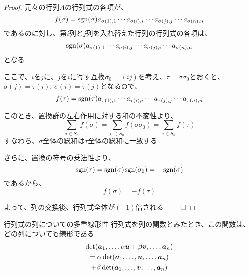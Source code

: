 \documentclass[../../../topic_linear-algebra]{subfiles}
\begin{document}
\begin{proof}
  元々の行列$A$の行列式の各項が、
  \begin{equation*}
    f(\sigma) =\operatorname{sgn}(\sigma) a_{\sigma(1),1} \cdots a_{\sigma(i),i} \cdots a_{\sigma(j),j} \cdots a_{\sigma(n),n}
  \end{equation*}
  であるのに対し、第$i$列と$j$列を入れ替えた行列の行列式の各項は、
  \begin{equation*}
    \operatorname{sgn}(\sigma) a_{\sigma(1),1} \cdots a_{\sigma(i),j} \cdots a_{\sigma(j),i} \cdots a_{\sigma(n),n}
  \end{equation*}
  となる

  ここで、$i$を$j$に、$j$を$i$に写す互換$\sigma_0 = (ij)$を考え、$\tau = \sigma \sigma_0$とおくと、$\sigma(j) = \tau(i), \, \sigma(i) = \tau(j)$となるので、
  \begin{equation*}
    f(\tau) = \operatorname{sgn}(\tau) a_{\tau(1),1} \cdots a_{\tau(i),i} \cdots a_{\tau(j),j} \cdots a_{\tau(n),n}
  \end{equation*}

  このとき、\hyperref[thm:sum-invariance-under-permutation-action]{置換群の左右作用に対する和の不変性}より、
  \begin{equation*}
    \sum_{\sigma \in S_n} f(\sigma) = \sum_{\sigma \in S_n} f(\sigma\sigma_0) = \sum_{\tau \in S_n} f(\tau)
  \end{equation*}
  すなわち、$\sigma$全体の総和は$\tau$全体の総和に一致する

  \br

  さらに、\hyperref[thm:sign-multiplicativity]{置換の符号の乗法性}より、
  \begin{equation*}
    \operatorname{sgn}(\tau) = \operatorname{sgn}(\sigma) \operatorname{sgn}(\sigma_0) = -\operatorname{sgn}(\sigma)
  \end{equation*}
  であるから、
  \begin{equation*}
    f(\sigma) = -f(\tau)
  \end{equation*}

  よって、列の交換後、行列式全体が$(-1)$倍される $\qed$
\end{proof}

\sectionline

\begin{theorem}{行列式の列についての多重線形性}
  行列式を列の関数とみたとき、この関数は、どの列についても線形である
  \begin{multline*}
    \det(\vb*{a}_1,\ldots,\alpha\vb*{u} + \beta\vb*{v}, \ldots, \vb*{a}_n) \\
    = \alpha\det(\vb*{a}_1,\ldots,\vb*{u},\ldots,\vb*{a}_n) \\
    + \beta\det(\vb*{a}_1,\ldots,\vb*{v},\ldots,\vb*{a}_n)
  \end{multline*}
\end{theorem}
\end{document}
